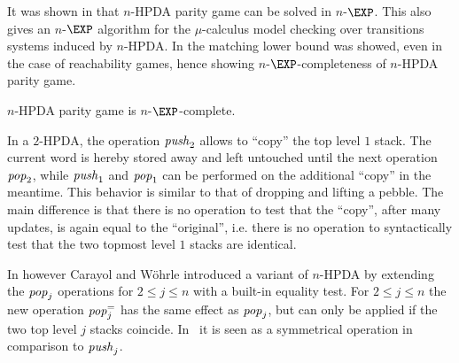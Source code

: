 It was shown in \cite{Cach03} that {\sc $n$-HPDA parity game} can
be solved in $n$-$\EXP$. This also gives an $n$-$\EXP$ algorithm for the $\mu$-calculus
model checking over transitions systems induced by  $n$-HPDA.
In \cite{cachat2007complexity} the matching lower bound was showed, even in the case of reachability games,
hence showing $n$-$\EXP$-completeness of {\sc $n$-HPDA parity game}.

\begin{theorem}{\cite{ Cach03, cachat2007complexity}}
{\sc $n$-HPDA parity game} is $n$-$\EXP$-complete.
\end{theorem}




In a $2$-HPDA, the operation $\text{\textit{push}}_2$ %
allows to ``copy'' the top level $1$ stack. The current word is hereby stored away and left untouched
until the next operation $\text{\textit{pop}}_2$,
while $\text{\textit{push}}_1$ and $\text{\textit{pop}}_1$ can be performed on the additional ``copy'' in the meantime. This behavior is similar to that of dropping and lifting a pebble. 
The main difference is that there is no operation to test that the ``copy'', after many updates, is again equal to the ``original'', i.e. there is no operation to syntactically test that the two topmost level $1$ stacks are identical.

In \cite{CaWoe03, Woeh05, carayol2006automates} however 
Carayol and W\"ohrle
 introduced a variant of $n$-HPDA by extending the 
$\text{\textit{pop}}_j$ operations for $2 \leq j \leq n$ with a built-in equality test. 
For $2 \leq j \leq n$ 
the new operation
$\text{\textit{pop}}_j^=$ has the same effect as $\text{\textit{pop}}_j$, but
can only be applied if the two top level $j$ stacks coincide.
In \cite{carayol2006automates} it is seen as a symmetrical operation in comparison to
$\text{\textit{push}}_j$.\\

